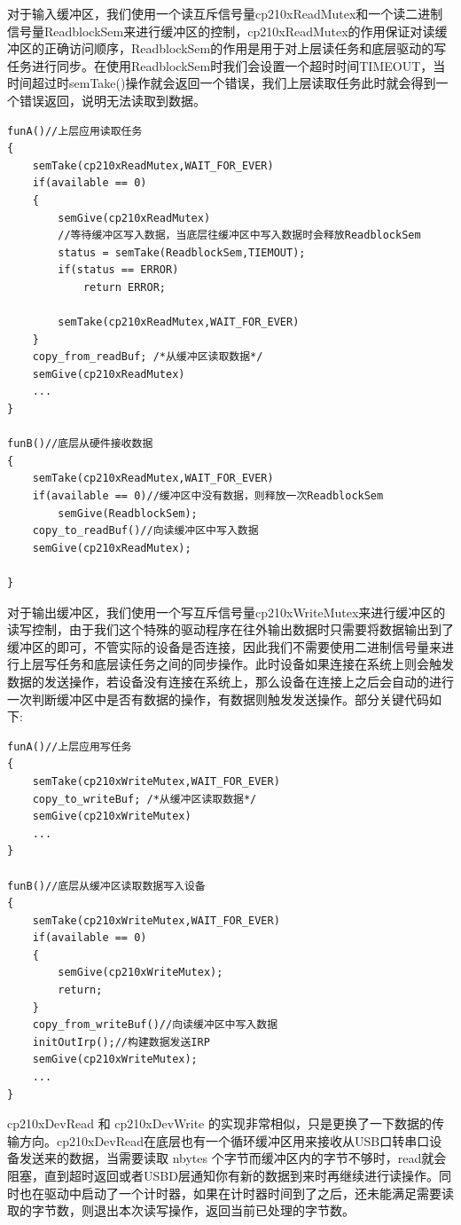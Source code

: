 	对于输入缓冲区，我们使用一个读互斥信号量cp210xReadMutex和一个读二进制信号量ReadblockSem来进行缓冲区的控制，cp210xReadMutex的作用保证对读缓冲区的正确访问顺序，ReadblockSem的作用是用于对上层读任务和底层驱动的写任务进行同步。在使用ReadblockSem时我们会设置一个超时时间TIMEOUT，当时间超过时semTake()操作就会返回一个错误，我们上层读取任务此时就会得到一个错误返回，说明无法读取到数据。

\lstset{language=C}
\begin{lstlisting}
funA()//上层应用读取任务
{	
	semTake(cp210xReadMutex,WAIT_FOR_EVER)	
	if(available == 0)
	{
		semGive(cp210xReadMutex)
		//等待缓冲区写入数据，当底层往缓冲区中写入数据时会释放ReadblockSem
		status = semTake(ReadblockSem,TIEMOUT);
		if(status == ERROR)
			return ERROR;
			
		semTake(cp210xReadMutex,WAIT_FOR_EVER)
	}
	copy_from_readBuf; /*从缓冲区读取数据*/
	semGive(cp210xReadMutex)
	...
}

funB()//底层从硬件接收数据
{
	semTake(cp210xReadMutex,WAIT_FOR_EVER)
	if(available == 0)//缓冲区中没有数据，则释放一次ReadblockSem
		semGive(ReadblockSem);
	copy_to_readBuf()//向读缓冲区中写入数据
	semGive(cp210xReadMutex);
	
}
\end{lstlisting}  


	对于输出缓冲区，我们使用一个写互斥信号量cp210xWriteMutex来进行缓冲区的读写控制，由于我们这个特殊的驱动程序在往外输出数据时只需要将数据输出到了缓冲区的即可，不管实际的设备是否连接，因此我们不需要使用二进制信号量来进行上层写任务和底层读任务之间的同步操作。此时设备如果连接在系统上则会触发数据的发送操作，若设备没有连接在系统上，那么设备在连接上之后会自动的进行一次判断缓冲区中是否有数据的操作，有数据则触发发送操作。部分关键代码如下:

\lstset{language=C}
\begin{lstlisting}
funA()//上层应用写任务
{	
	semTake(cp210xWriteMutex,WAIT_FOR_EVER)	
	copy_to_writeBuf; /*从缓冲区读取数据*/
	semGive(cp210xWriteMutex)
	...
}

funB()//底层从缓冲区读取数据写入设备
{
	semTake(cp210xWriteMutex,WAIT_FOR_EVER)
	if(available == 0)
	{
		semGive(cp210xWriteMutex);
		return;
	}	
	copy_from_writeBuf()//向读缓冲区中写入数据
	initOutIrp();//构建数据发送IRP
	semGive(cp210xWriteMutex);
	...
}
\end{lstlisting}  

cp210xDevRead 和 cp210xDevWrite 的实现非常相似，只是更换了一下数据的传输方向。cp210xDevRead在底层也有一个循环缓冲区用来接收从USB口转串口设备发送来的数据，当需要读取 nbytes 个字节而缓冲区内的字节不够时，read就会阻塞，直到超时返回或者USBD层通知你有新的数据到来时再继续进行读操作。同时也在驱动中启动了一个计时器，如果在计时器时间到了之后，还未能满足需要读取的字节数，则退出本次读写操作，返回当前已处理的字节数。



